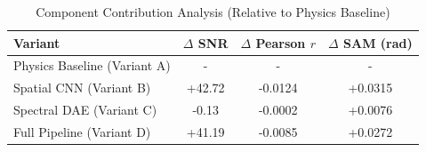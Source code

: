 \begin{table}[ht]
\centering
\caption{Component Contribution Analysis (Relative to Physics Baseline)}
\begin{tabular}{lccc}
\hline
Variant & $\Delta$ SNR & $\Delta$ Pearson $r$ & $\Delta$ SAM (rad) \\
\hline
Physics Baseline (Variant A) & - & - & - \\
Spatial CNN (Variant B) & +42.72 & -0.0124 & +0.0315 \\
Spectral DAE (Variant C) & -0.13 & -0.0002 & +0.0076 \\
Full Pipeline (Variant D) & +41.19 & -0.0085 & +0.0272 \\
\hline
\end{tabular}
\end{table}
